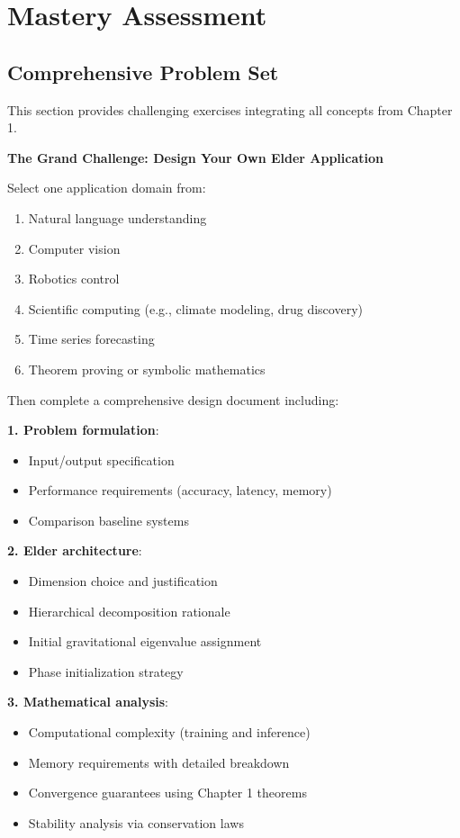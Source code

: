 \chapter{Mastery Assessment}

\section{Comprehensive Problem Set}

This section provides challenging exercises integrating all concepts from Chapter 1.

\begin{challenge}
\textbf{The Grand Challenge: Design Your Own Elder Application}

Select one application domain from:
\begin{enumerate}
\item Natural language understanding
\item Computer vision
\item Robotics control
\item Scientific computing (e.g., climate modeling, drug discovery)
\item Time series forecasting
\item Theorem proving or symbolic mathematics
\end{enumerate}

Then complete a comprehensive design document including:

\textbf{1. Problem formulation}:
\begin{itemize}
\item Input/output specification
\item Performance requirements (accuracy, latency, memory)
\item Comparison baseline systems
\end{itemize}

\textbf{2. Elder architecture}:
\begin{itemize}
\item Dimension choice and justification
\item Hierarchical decomposition rationale
\item Initial gravitational eigenvalue assignment
\item Phase initialization strategy
\end{itemize}

\textbf{3. Mathematical analysis}:
\begin{itemize}
\item Computational complexity (training and inference)
\item Memory requirements with detailed breakdown
\item Convergence guarantees using Chapter 1 theorems
\item Stability analysis via conservation laws
\end{itemize}


\end{challenge}
